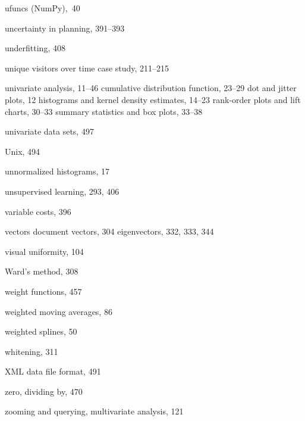 \documentclass{Oreilly5980006}
\begin{document}
\begin{theindex}
  \item ufuncs (NumPy),~40
  \item uncertainty in planning, 391--393
  \item underfitting, 408
  \item unique visitors over time case study, 211--215
  \item univariate analysis, 11--46
    \subitem cumulative distribution function, 23--29
    \subitem dot and jitter plots, 12
    \subitem histograms and kernel density estimates, 14--23
    \subitem rank-order plots and lift charts, 30--33
    \subitem summary statistics and box plots, 33--38
  \item univariate data sets, 497
  \item Unix, 494
  \item unnormalized histograms, 17
  \item unsupervised learning, 293, 406\vspace*{-2pt}

  \indexspace

  \item variable costs, 396
  \item vectors
    \subitem document vectors, 304
    \subitem eigenvectors, 332, 333, 344
  \item visual uniformity, 104\vspace*{-2pt}

  \indexspace

  \item Ward's method, 308
  \item weight functions, 457
  \item weighted moving averages, 86
  \item weighted splines, 50
  \item whitening, 311\vspace*{-2pt}

  \indexspace

  \item XML data file format, 491\vspace*{-2pt}

  \indexspace

  \item zero, dividing by, 470
  \item zooming and querying, multivariate analysis, 121

\end{theindex}
\clearpage
\
\thispagestyle{empty}
\
\clearpage
\end{document}
